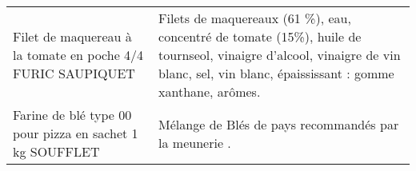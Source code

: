 \begin{longtable}{p{5cm}p{10cm}}
                                              Filet de maquereau à la tomate en poche 4/4 FURIC SAUPIQUET &                                                                                                                                                                                                                                                                                                                                                                                                                                                                                                                                                                                                                                                                                                                                                                                                                                                        Filets de maquereaux (61 \%), eau, concentré de tomate (15\%), huile de tournseol, vinaigre d'alcool, vinaigre de vin blanc, sel, vin blanc, épaississant : gomme xanthane, arômes. \\
                                                 Farine de blé type 00 pour pizza en sachet 1 kg SOUFFLET &                                                                                                                                                                                                                                                                                                                                                                                                                                                                                                                                                                                                                                                                                                                                                                                                                                                                                                                                                                                    Mélange de Blés de pays recommandés par la meunerie . \\

\end{longtable}
